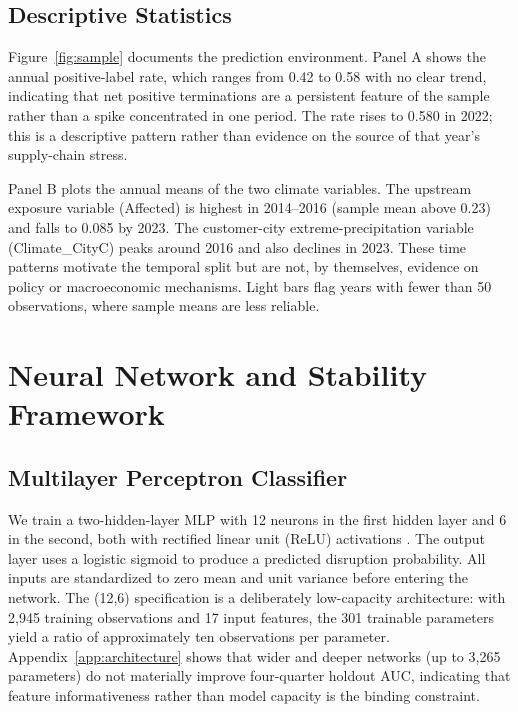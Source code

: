 \documentclass[12pt]{article}
\begin{document}
\subsection{Descriptive Statistics}

Figure~\ref{fig:sample} documents the prediction environment.  Panel A
shows the annual positive-label rate, which ranges from 0.42 to 0.58 with
no clear trend, indicating that net positive terminations are a persistent
feature of the sample rather than a spike concentrated in one period.  The
rate rises to 0.580 in 2022; this is a descriptive pattern rather than
evidence on the source of that year's supply-chain stress.

Panel B plots the annual means of the two climate variables.  The upstream
exposure variable (Affected) is highest in 2014--2016 (sample mean above
0.23) and falls to 0.085 by 2023.  The customer-city
extreme-precipitation variable (Climate\_CityC) peaks around 2016 and also
declines in 2023.  These time patterns motivate the temporal split but are
not, by themselves, evidence on policy or macroeconomic mechanisms.
Light bars flag years with fewer than 50 observations, where sample means
are less reliable.

\section{Neural Network and Stability Framework}\label{sec:method}

\subsection{Multilayer Perceptron Classifier}

We train a two-hidden-layer MLP with 12 neurons in the first hidden layer
and 6 in the second, both with rectified linear unit (ReLU) activations
\citep{lecun2015deep}.  The output layer uses a logistic sigmoid to
produce a predicted disruption probability.  All inputs are standardized
to zero mean and unit variance before entering the network.  The (12,6)
specification is a deliberately low-capacity architecture: with 2,945
training observations and 17 input features, the 301 trainable parameters
yield a ratio of approximately ten observations per parameter.
Appendix~\ref{app:architecture} shows that wider and deeper networks
(up to 3,265 parameters) do not materially improve four-quarter holdout AUC,
indicating that feature informativeness rather than model capacity is the
binding constraint.
\end{document}
